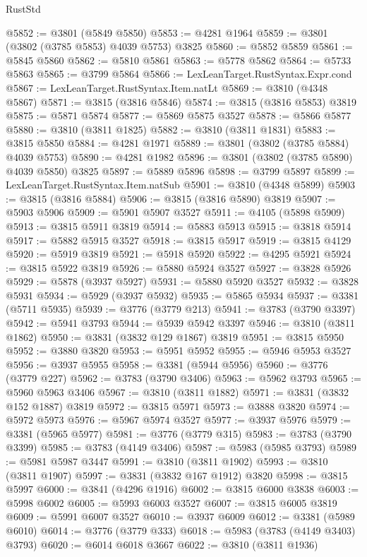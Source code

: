 \begin{lexlean}{RustStd}
\begin{coremodule}
@5852 := @3801 (@5849 @5850)
@5853 := @4281 @1964
@5859 := @3801 (@3802 (@3785 @5853) @4039 @5753) @3825
@5860 := @5852 @5859
@5861 := @5845 @5860
@5862 := @5810 @5861
@5863 := @5778 @5862
@5864 := @5733 @5863
@5865 := @3799 @5864
@5866 := LexLeanTarget.RustSyntax.Expr.cond
@5867 := LexLeanTarget.RustSyntax.Item.natLt
@5869 := @3810 (@4348 @5867)
@5871 := @3815 (@3816 @5846)
@5874 := @3815 (@3816 @5853) @3819
@5875 := @5871 @5874
@5877 := @5869 @5875 @3527
@5878 := @5866 @5877
@5880 := @3810 (@3811 @1825)
@5882 := @3810 (@3811 @1831)
@5883 := @3815 @5850
@5884 := @4281 @1971
@5889 := @3801 (@3802 (@3785 @5884) @4039 @5753)
@5890 := @4281 @1982
@5896 := @3801 (@3802 (@3785 @5890) @4039 @5850) @3825
@5897 := @5889 @5896
@5898 := @3799 @5897
@5899 := LexLeanTarget.RustSyntax.Item.natSub
@5901 := @3810 (@4348 @5899)
@5903 := @3815 (@3816 @5884)
@5906 := @3815 (@3816 @5890) @3819
@5907 := @5903 @5906
@5909 := @5901 @5907 @3527
@5911 := @4105 (@5898 @5909)
@5913 := @3815 @5911 @3819
@5914 := @5883 @5913
@5915 := @3818 @5914
@5917 := @5882 @5915 @3527
@5918 := @3815 @5917
@5919 := @3815 @4129
@5920 := @5919 @3819
@5921 := @5918 @5920
@5922 := @4295 @5921
@5924 := @3815 @5922 @3819
@5926 := @5880 @5924 @3527
@5927 := @3828 @5926
@5929 := @5878 (@3937 @5927)
@5931 := @5880 @5920 @3527
@5932 := @3828 @5931
@5934 := @5929 (@3937 @5932)
@5935 := @5865 @5934
@5937 := @3381 (@5711 @5935)
@5939 := @3776 (@3779 @213)
@5941 := @3783 (@3790 @3397)
@5942 := @5941 @3793
@5944 := @5939 @5942 @3397
@5946 := @3810 (@3811 @1862)
@5950 := @3831 (@3832 @129 @1867) @3819
@5951 := @3815 @5950
@5952 := @3880 @3820
@5953 := @5951 @5952
@5955 := @5946 @5953 @3527
@5956 := @3937 @5955
@5958 := @3381 (@5944 @5956)
@5960 := @3776 (@3779 @227)
@5962 := @3783 (@3790 @3406)
@5963 := @5962 @3793
@5965 := @5960 @5963 @3406
@5967 := @3810 (@3811 @1882)
@5971 := @3831 (@3832 @152 @1887) @3819
@5972 := @3815 @5971
@5973 := @3888 @3820
@5974 := @5972 @5973
@5976 := @5967 @5974 @3527
@5977 := @3937 @5976
@5979 := @3381 (@5965 @5977)
@5981 := @3776 (@3779 @315)
@5983 := @3783 (@3790 @3399)
@5985 := @3783 (@4149 @3406)
@5987 := @5983 (@5985 @3793)
@5989 := @5981 @5987 @3447
@5991 := @3810 (@3811 @1902)
@5993 := @3810 (@3811 @1907)
@5997 := @3831 (@3832 @167 @1912) @3820
@5998 := @3815 @5997
@6000 := @3841 (@4296 @1916)
@6002 := @3815 @6000 @3838
@6003 := @5998 @6002
@6005 := @5993 @6003 @3527
@6007 := @3815 @6005 @3819
@6009 := @5991 @6007 @3527
@6010 := @3937 @6009
@6012 := @3381 (@5989 @6010)
@6014 := @3776 (@3779 @333)
@6018 := @5983 (@3783 (@4149 @3403) @3793)
@6020 := @6014 @6018 @3667
@6022 := @3810 (@3811 @1936)

\end{coremodule}
\end{lexlean}
